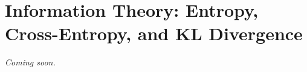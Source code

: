 \chapter{Information Theory: Entropy, Cross-Entropy, and KL Divergence}
\label{chap:ch08}

\textit{Coming soon.}
